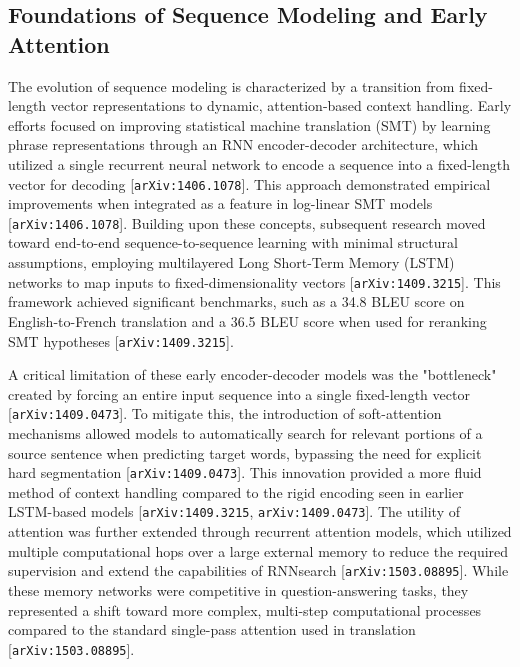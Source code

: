 \documentclass[11pt]{article}
\begin{document}
\subsection{Foundations of Sequence Modeling and Early Attention}

The evolution of sequence modeling is characterized by a transition from fixed-length vector representations to dynamic, attention-based context handling. Early efforts focused on improving statistical machine translation (SMT) by learning phrase representations through an RNN encoder-decoder architecture, which utilized a single recurrent neural network to encode a sequence into a fixed-length vector for decoding [\texttt{arXiv:1406.1078}]. This approach demonstrated empirical improvements when integrated as a feature in log-linear SMT models [\texttt{arXiv:1406.1078}]. Building upon these concepts, subsequent research moved toward end-to-end sequence-to-sequence learning with minimal structural assumptions, employing multilayered Long Short-Term Memory (LSTM) networks to map inputs to fixed-dimensionality vectors [\texttt{arXiv:1409.3215}]. This framework achieved significant benchmarks, such as a 34.8 BLEU score on English-to-French translation and a 36.5 BLEU score when used for reranking SMT hypotheses [\texttt{arXiv:1409.3215}].

A critical limitation of these early encoder-decoder models was the "bottleneck" created by forcing an entire input sequence into a single fixed-length vector [\texttt{arXiv:1409.0473}]. To mitigate this, the introduction of soft-attention mechanisms allowed models to automatically search for relevant portions of a source sentence when predicting target words, bypassing the need for explicit hard segmentation [\texttt{arXiv:1409.0473}]. This innovation provided a more fluid method of context handling compared to the rigid encoding seen in earlier LSTM-based models [\texttt{arXiv:1409.3215}, \texttt{arXiv:1409.0473}]. The utility of attention was further extended through recurrent attention models, which utilized multiple computational hops over a large external memory to reduce the required supervision and extend the capabilities of RNNsearch [\texttt{arXiv:1503.08895}]. While these memory networks were competitive in question-answering tasks, they represented a shift toward more complex, multi-step computational processes compared to the standard single-pass attention used in translation [\texttt{arXiv:1503.08895}].
\end{document}
